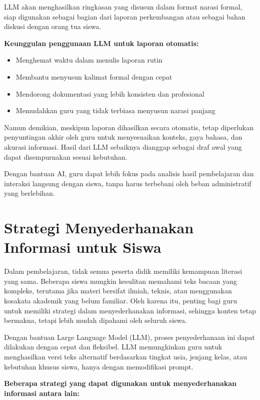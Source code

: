 LLM akan menghasilkan ringkasan yang disusun dalam format narasi formal, siap digunakan sebagai bagian dari laporan perkembangan atau sebagai bahan diskusi dengan orang tua siswa.

\textbf{Keunggulan penggunaan LLM untuk laporan otomatis:}
\begin{itemize}
	\item Menghemat waktu dalam menulis laporan rutin
	\item Membantu menyusun kalimat formal dengan cepat
	\item Mendorong dokumentasi yang lebih konsisten dan profesional
	\item Memudahkan guru yang tidak terbiasa menyusun narasi panjang
\end{itemize}

Namun demikian, meskipun laporan dihasilkan secara otomatis, tetap diperlukan penyuntingan akhir oleh guru untuk menyesuaikan konteks, gaya bahasa, dan akurasi informasi. Hasil dari LLM sebaiknya dianggap sebagai draf awal yang dapat disempurnakan sesuai kebutuhan.

Dengan bantuan AI, guru dapat lebih fokus pada analisis hasil pembelajaran dan interaksi langsung dengan siswa, tanpa harus terbebani oleh beban administratif yang berlebihan.


\section{Strategi Menyederhanakan Informasi untuk Siswa}

Dalam pembelajaran, tidak semua peserta didik memiliki kemampuan literasi yang sama. Beberapa siswa mungkin kesulitan memahami teks bacaan yang kompleks, terutama jika materi bersifat ilmiah, teknis, atau menggunakan kosakata akademik yang belum familiar. Oleh karena itu, penting bagi guru untuk memiliki strategi dalam menyederhanakan informasi, sehingga konten tetap bermakna, tetapi lebih mudah dipahami oleh seluruh siswa.

Dengan bantuan Large Language Model (LLM), proses penyederhanaan ini dapat dilakukan dengan cepat dan fleksibel. LLM memungkinkan guru untuk menghasilkan versi teks alternatif berdasarkan tingkat usia, jenjang kelas, atau kebutuhan khusus siswa, hanya dengan memodifikasi prompt.

\textbf{Beberapa strategi yang dapat digunakan untuk menyederhanakan informasi antara lain:}

